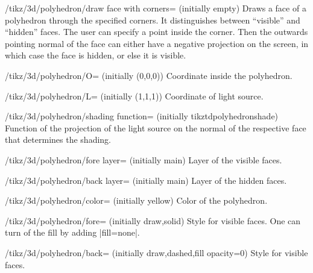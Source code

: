 \documentclass[a4paper,fleqn]{ltxdoc}
\begin{document}
\begin{key}{/tikz/3d/polyhedron/draw face with corners= (initially empty)}
		Draws a face of a polyhedron through the specified corners. 
		It distinguishes between ``visible'' and ``hidden'' faces. The user can
		specify a point inside the corner. Then the outwards pointing normal of
		the face can either have a negative projection on the screen, in which
		case the face is hidden, or else it is visible.
\end{key}

\begin{key}{/tikz/3d/polyhedron/O= (initially {(0,0,0)})}
 		Coordinate inside the polyhedron.
\end{key}

\begin{key}{/tikz/3d/polyhedron/L= (initially {(1,1,1)})}
 		Coordinate of light source.
\end{key}

\begin{key}{/tikz/3d/polyhedron/shading function= (initially tikztdpolyhedronshade)}
 		Function of the projection of the light source on the normal of the
		respective face that determines the shading.
\end{key}


\begin{key}{/tikz/3d/polyhedron/fore layer= (initially main)}
 		Layer of the visible faces.
\end{key}

\begin{key}{/tikz/3d/polyhedron/back layer= (initially main)}
 		Layer of the hidden faces.
\end{key}

\begin{key}{/tikz/3d/polyhedron/color= (initially yellow)}
 		Color of the polyhedron.
\end{key}

\begin{key}{/tikz/3d/polyhedron/fore= (initially {draw,solid})}
 		Style for visible faces. One can turn of the fill by adding |fill=none|.
\end{key}


\begin{key}{/tikz/3d/polyhedron/back= (initially {draw,dashed,fill opacity=0})}
 		Style for visible faces.
\end{key}
\end{document}

